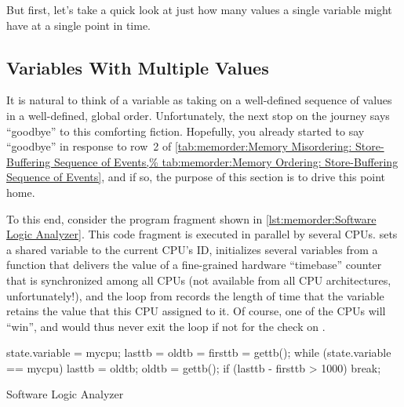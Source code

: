 But first, let's take a quick look at just how many values a single
variable might have at a single point in time.

\subsection{Variables With Multiple Values}
\label{sec:memorder:Variables With Multiple Values}

It is natural to think of a variable as taking on a well-defined
sequence of values in a well-defined, global order.
Unfortunately, the next stop on the journey says ``goodbye'' to this comforting fiction.
Hopefully, you already started to say ``goodbye'' in response to row~2 of
\cref{tab:memorder:Memory Misordering: Store-Buffering Sequence of Events,%
tab:memorder:Memory Ordering: Store-Buffering Sequence of Events},
and if so, the purpose of this section is to drive this point home.

\begin{fcvref}
To this end, consider the program fragment shown in
\cref{lst:memorder:Software Logic Analyzer}.
This code fragment is executed in parallel by several CPUs.
 sets a shared variable to the current CPU's ID, 
initializes several variables from a  function that
delivers the value of a fine-grained hardware ``timebase'' counter that is
synchronized among all CPUs (not available from all CPU architectures,
unfortunately!), and the loop from 
records the length of
time that the variable retains the value that this CPU assigned to it.
Of course, one of the CPUs will ``win'', and would thus never exit
the loop if not for the check on .
\end{fcvref}

\QuickQuizEnd

\begin{listing}
\begin{fcvlabel}
\begin{VerbatimL}[commandchars=\\\[\]]
state.variable = mycpu;			\lnlbl[setid]
lasttb = oldtb = firsttb = gettb();	\lnlbl[init]
while (state.variable == mycpu) {	\lnlbl[loop:b]
	lasttb = oldtb;
	oldtb = gettb();
	if (lasttb - firsttb > 1000)	\lnlbl[iftmout]
		break;			\lnlbl[break]
}					\lnlbl[loop:e]
\end{VerbatimL}
\end{fcvlabel}
\caption{Software Logic Analyzer}
\label{lst:memorder:Software Logic Analyzer}
\end{listing}

